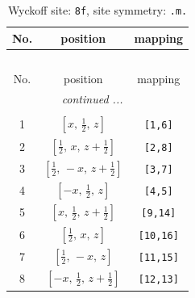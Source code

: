\documentclass[fleqn,8pt]{jsarticle}
\begin{document}
\begin{longtable}{ccc}
\caption{Wyckoff site: {\tt 8f}, site symmetry: {\tt .m.}}
 \\
 \hline \hline
No. & position & mapping \\ \hline \endfirsthead

\multicolumn{2}{l}{\tablename\ \thetable{}} \\
 \hline \hline
No. & position & mapping \\ \hline \endhead

 \hline \hline
\multicolumn{2}{r}{\footnotesize\it continued ...} \\ \endfoot

 \hline \hline
\multicolumn{2}{r}{} \\ \endlastfoot

1 & $\left[ x,\, \frac{1}{2},\, z \right]$ & {\tt [1,6]} \\ \hline
2 & $\left[ \frac{1}{2},\, x,\, z + \frac{1}{2} \right]$ & {\tt [2,8]} \\ \hline
3 & $\left[ \frac{1}{2},\, - x,\, z + \frac{1}{2} \right]$ & {\tt [3,7]} \\ \hline
4 & $\left[ - x,\, \frac{1}{2},\, z \right]$ & {\tt [4,5]} \\ \hline
5 & $\left[ x,\, \frac{1}{2},\, z + \frac{1}{2} \right]$ & {\tt [9,14]} \\ \hline
6 & $\left[ \frac{1}{2},\, x,\, z \right]$ & {\tt [10,16]} \\ \hline
7 & $\left[ \frac{1}{2},\, - x,\, z \right]$ & {\tt [11,15]} \\ \hline
8 & $\left[ - x,\, \frac{1}{2},\, z + \frac{1}{2} \right]$ & {\tt [12,13]} \\
\end{longtable}
\renewcommand{\arraystretch}{1.2}
\end{document}
